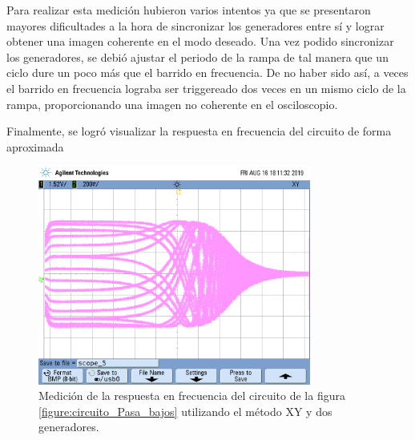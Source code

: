 \documentclass[11pt, a4paper]{article}
\begin{document}
Para realizar esta medición hubieron varios intentos ya que se presentaron mayores dificultades a la hora de sincronizar los generadores entre sí y lograr obtener una imagen coherente en el modo deseado. Una vez podido sincronizar los generadores, se debió ajustar el periodo de la rampa de tal manera que un ciclo dure un poco más que el barrido en frecuencia. De no haber sido así, a veces el barrido en frecuencia lograba ser triggereado dos veces en un mismo ciclo de la rampa, proporcionando una imagen no coherente en el osciloscopio.

Finalmente, se logró visualizar la respuesta en frecuencia del circuito de forma aproximada

\begin{figure}[H]
	\centering
	\includegraphics[width=0.8\textwidth,trim={0.5cm 5cm  1 5cm},clip]{ej3xy.png}
	\caption{Medición de la respuesta en frecuencia del circuito de la figura \ref{figure:circuito_Pasa_bajos} utilizando el método XY y dos generadores.} 
	\label{graf:osci_freq_alta}
\end{figure}
\end{document}
